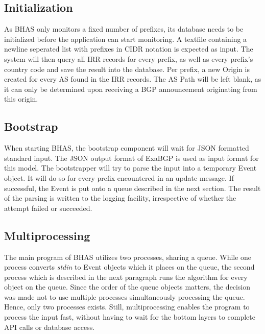 \subsection{Initialization}\label{subsec:bhasinitialization}
As BHAS only monitors a fixed number of prefixes, its database needs to be initialized before the application can start monitoring. A textfile containing a newline seperated list with prefixes in CIDR notation is expected as input. The system will then query all IRR records for every prefix, as well as every prefix's country code and save the result into the database. Per prefix, a new Origin is created for every AS found in the IRR records. The AS Path will be left blank, as it can only be determined upon receiving a BGP announcement originating from this origin.

\subsection{Bootstrap}\label{subsec:bhasbootstrap}
When starting BHAS, the bootstrap component will wait for JSON formatted standard input. The JSON output format of ExaBGP is used as input format for this model. The bootstrapper will try to parse the input into a temporary Event object. It will do so for every prefix encountered in an update message. If successful, the Event is put onto a queue described in the next section. The result of the parsing is written to the logging facility, irrespective of whether the attempt failed or succeeded.

\subsection{Multiprocessing}\label{subsec:bhasmultiprocessing}
The main program of BHAS utilizes two processes, sharing a queue. While one process converts \emph{stdin} to Event objects which it places on the queue, the second process which is described in the next paragraph runs the algorithm for every object on the queue. Since the order of the queue objects matters, the decision was made not to use multiple processes simultaneously processing the queue. Hence, only two processes exists. Still, multiprocessing enables the program to process the input fast, without having to wait for the bottom layers to complete API calls or database access.

